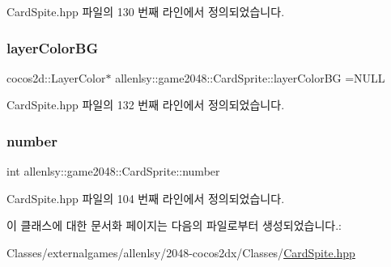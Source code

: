 Card\+Spite.\+hpp 파일의 130 번째 라인에서 정의되었습니다.

\mbox{\label{classallenlsy_1_1game2048_1_1_card_sprite_a584c629ff6b2e403fd2393e6edf4e840}} 
\subsubsection{\texorpdfstring{layer\+Color\+BG}{layerColorBG}}
{\footnotesize\ttfamily cocos2d\+::\+Layer\+Color$\ast$ allenlsy\+::game2048\+::\+Card\+Sprite\+::layer\+Color\+BG =N\+U\+LL\hspace{0.3cm}{\ttfamily [private]}}



Card\+Spite.\+hpp 파일의 132 번째 라인에서 정의되었습니다.

\mbox{\label{classallenlsy_1_1game2048_1_1_card_sprite_ad792455a70c4dee8eaf5da553be6f88e}} 
\subsubsection{\texorpdfstring{number}{number}}
{\footnotesize\ttfamily int allenlsy\+::game2048\+::\+Card\+Sprite\+::number\hspace{0.3cm}{\ttfamily [private]}}



Card\+Spite.\+hpp 파일의 104 번째 라인에서 정의되었습니다.



이 클래스에 대한 문서화 페이지는 다음의 파일로부터 생성되었습니다.\+:\begin{DoxyCompactItemize}
\item 
Classes/externalgames/allenlsy/2048-\/cocos2dx/\+Classes/\hyperlink{_card_spite_8hpp}{Card\+Spite.\+hpp}\end{DoxyCompactItemize}
